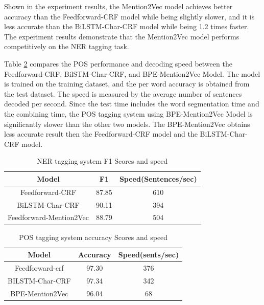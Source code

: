 \documentclass{sfuthesis}
\begin{document}
Shown in the experiment results, the Mention2Vec model achieves better accuracy than the Feedforward-CRF model while being slightly slower, and it is less accurate than the BiLSTM-Char-CRF model while being 1.2 times faster. The experiment results demonstrate that the Mention2Vec model performs competitively on the NER tagging task.

Table \ref{table:pos-mention2vec} compares the POS performance and decoding speed between the Feedforward-CRF, BilSTM-Char-CRF, and BPE-Mention2Vec Model. The model is trained on the training dataset, and the per word accuracy is obtained from the test dataset. The speed is measured by the average number of sentences decoded per second. Since the test time includes the word segmentation time and the combining time, the POS tagging system using BPE-Mention2Vec Model is significantly slower than the other two models. The BPE-Mention2Vec obtains less accurate result then the Feedforward-CRF model and the BiLSTM-Char-CRF model. 

\begin{table}[]
\centering
\caption{NER tagging system F1 Scores and speed }
\label{table:ner-mention2vec}
\begin{tabular}{|c|c|c|}
\hline
Model            & F1     & Speed(Sentences/sec)        \\ \hline
Feedforward-CRF  & 87.85  & 610                     \\ \hline
BiLSTM-Char-CRF & 90.11  & 394                     \\ \hline
Feedforward-Mention2Vec      & 88.79  & 504                     \\ \hline
\end{tabular}
\end{table}

\begin{table}[]
\centering
\caption{POS tagging system accuracy Scores and speed}
\label{table:pos-mention2vec}
\begin{tabular}{|c|c|c|}
\hline
Model            & Accuracy     & Speed(sents/sec)        \\ \hline
Feedforward-crf  & 97.30  & 376                     \\ \hline
BILSTM-Char-CRF & 97.34  & 342                    \\ \hline
BPE-Mention2Vec      & 96.04  & 68                    \\ \hline
\end{tabular}
\end{table}
\end{document}
